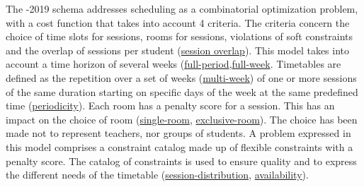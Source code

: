 The \ITC{}-2019 schema addresses scheduling as a combinatorial optimization problem, with a cost function that takes into account 4 criteria. The criteria concern the choice of time slots for sessions, rooms for sessions, violations of soft constraints and the overlap of sessions per student 
(\hyperref[feat:studentsessionoverlap]{session overlap}).
This model takes into account a time horizon of several weeks 
(\hyperref[feat:fullperiod]{full-period},\hyperref[feat:fullweek]{full-week}.
Timetables are defined as the repetition over a set of weeks 
(\hyperref[feat:singleweek]{multi-week}) 
of one or more sessions of the same duration starting on specific days of the week at the same predefined time 
(\hyperref[feat:periodicity]{periodicity}).
Each room has a penalty score for a session. This has an impact on the choice of room 
(\hyperref[feat:roommodal]{single-room}, \hyperref[feat:roommodal]{exclusive-room}).
The choice has been made not to represent teachers, nor groups of students. %
A problem expressed in this model comprises a constraint catalog made up of flexible constraints with a penalty score. The catalog of constraints is used to ensure quality and to express the different needs of the timetable 
(\hyperref[feat:sessiondistribution]{session-distribution}, \hyperref[feat:availability]{availability}).



